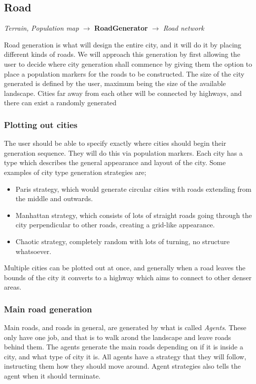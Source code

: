 \subsection{Road}
\begin{center}
  \textit{Terrain, Population map} $\rightarrow$ \textbf{RoadGenerator} $\rightarrow$ \textit{Road network} 
\end{center}
Road generation is what will design the entire city, and it will do it by placing different kinds of roads.
We will approach this generation by first allowing the user to decide where city generation shall commence by giving them the option to place a population markers for the roads to be constructed.
The size of the city generated is defined by the user, maximum being the size of the available landscape.
Cities far away from each other will be connected by highways, and there can exist a randomly generated 

\subsubsection{Plotting out cities}
The user should be able to specify exactly where cities should begin their generation sequence.
They will do this via population markers.
Each city has a type which describes the general appearance and layout of the city.
Some examples of city type generation strategies are;
\begin{itemize}
  \item Paris strategy, which would generate circular cities with roads extending from the middle and outwards.
  \item Manhattan strategy, which consists of lots of straight roads going through the city perpendicular to other roads, creating a grid-like appearance.
  \item Chaotic strategy, completely random with lots of turning, no structure whatsoever.
\end{itemize}

Multiple cities can be plotted out at once, and generally when a road leaves the bounds of the city it converts to a highway which aims to connect to other denser areas.

\subsubsection{Main road generation}
Main roads, and roads in general, are generated by what is called \textit{Agents}.
These only have one job, and that is to walk arond the landscape and leave roads behind them.
The agents generate the main roads depending on if it is inside a city, and what type of city it is.
All agents have a strategy that they will follow, instructing them how they should move around.
Agent strategies also tells the agent when it should terminate.

